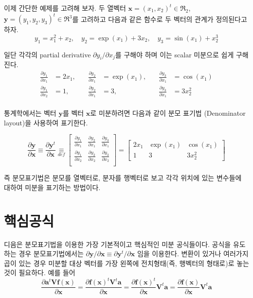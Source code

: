 \documentclass[
]{book}
\newcommand{\pardiff}[2]{\frac{\partial #1}{\partial #2 }}
\newcommand{\pardiffl}[2]{{\partial #1}/{\partial #2 }}
\theoremstyle{definition}
\theoremstyle{definition}
\theoremstyle{definition}
\theoremstyle{remark}
\begin{document}
이제 간단한 예제를 고려해 보자. 두 열벡터 \(\bm x=(x_1,x_2)^t \in \Re_2\), \(\bm y=(y_1,y_2,y_3)^t \in \Re^3\)를 고려하고 다음과 같은 함수로 두 벡터의 관계가 정의된다고 하자.
\[ y_1 = x_1^2 + x_2, \quad y_2= \exp (x_1) + 3 x_2, \quad y_3 = \sin(x_1) + x_2^3 \]

일단 각각의 partial derivative \(\pardiffl{y_i}{x_j}\)를 구해야 하며 이는 scalar 미분으로 쉽게 구해진다.
\begin{align*}
\pardiff{  y_1}{ x_1} & = 2x_1, & \quad \pardiff{  y_2}{ x_1} & = \exp(x_1), & \quad
\pardiff{  y_3}{ x_1} & = \cos(x_1) \\
\pardiff{  y_1}{ x_2} & = 1,    & \quad \pardiff{  y_2}{ x_1} & = 3,         & \quad
\pardiff{  y_3}{ x_1} & = 3 x_2^2 \\
\end{align*}

통계학에서는 벡터 \(\bm y\)를 벡터 \(\bm x\)로 미분하려면 다음과 같이 분모 표기법 (Denominator layout)을 사용하여 표기한다.

\begin{equation*}
\pardiff{ \bm y}{\bm x}  \equiv \pardiff{ \bm y^t}{\bm x}
\underset{def}{\equiv} \begin{bmatrix}
\pardiff{  y_1}{ x_1} &  \pardiff{  y_2}{ x_1} &  \pardiff{  y_3}{ x_1}  \\
\pardiff{  y_1}{ x_2} &  \pardiff{  y_2}{ x_2} &  \pardiff{  y_3}{ x_2}  \\
\end{bmatrix}
=  \begin{bmatrix}
2x_1 &  \exp(x_1) & \cos(x_1)  \\
1 &  3  &  3x_2^2
\end{bmatrix}
\end{equation*}

즉 분모표기법은 분모를 열벡터로, 분자를 행벡터로 보고 각각 위치에 있는 변수들에 대하여 미분을 표기하는 방법이다.

\hypertarget{uxd575uxc2ecuxacf5uxc2dd}{%
\section{핵심공식}\label{uxd575uxc2ecuxacf5uxc2dd}}

디음은 분모표기법을 이용한 가장 기본적이고 핵심적인 미분 공식들이다. 공식을 유도하는 경우 분모표기법에서는 \(\pardiffl{\bm y}{\bm x} \equiv \pardiffl{\bm y^t}{\bm x}\) 임을 이용한다. 변환이 있거나 여러가지 곱이 있는 경우 미분할 대상 벡터를 가장 왼쪽에 전치형태(즉, 행벡터의 형태로)로 놓는 것이 필요하다. 예를 들어
\[  \pardiff{ \bm a^t \bm V \bm f(\bm x)}{\bm x} = \pardiff{\bm f(\bm x)^t \bm V^t \bm a}{\bm x} =
\pardiff{\bm f(\bm x)^t }{\bm x} \bm V^t \bm a  = \pardiff{\bm f(\bm x) }{\bm x} \bm V^t \bm a \]
\end{document}
